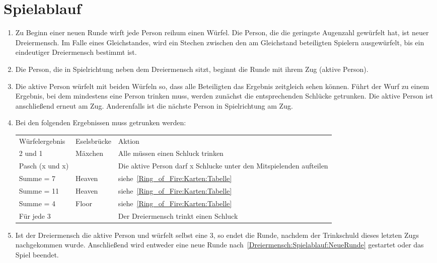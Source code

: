 \section{Spielablauf}
\begin{enumerate}[label={(\arabic*)}]
	\item\label{Dreiermensch:Spielablauf:NeueRunde}
	Zu Beginn einer neuen Runde wirft jede Person reihum einen Würfel.
	Die Person, die die geringste Augenzahl gewürfelt hat, ist neuer Dreiermensch.
	Im Falle eines Gleichstandes, wird ein Stechen zwischen den am Gleichstand beteiligten Spielern ausgewürfelt, bis ein eindeutiger Dreiermensch bestimmt ist.
	
	\item
	Die Person, die in Spielrichtung neben dem Dreiermensch sitzt, beginnt die Runde mit ihrem Zug (\glqq{}aktive Person\grqq{}).
	
	\item
	Die aktive Person würfelt mit beiden Würfeln so, dass alle Beteiligten das Ergebnis zeitgleich sehen können.
	Führt der Wurf zu einem Ergebnis, bei dem mindestens eine Person trinken muss, werden zunächst die entsprechenden Schlücke getrunken.
	Die aktive Person ist anschließend erneut am Zug.
	Anderenfalls ist die nächste Person in Spielrichtung am Zug.
	
	\item
	Bei den folgenden Ergebnissen muss getrunken werden:

	\begin{tabulary}{0.92\textwidth}{llL}
		\toprule
		Würfelergebnis   & Eselsbrücke & Aktion \\
		2 und 1          & Mäxchen & Alle müssen einen Schluck trinken \\
		Pasch (x und x)  &         & Die aktive Person darf x Schlucke unter den Mitspielenden aufteilen \\
		Summe = 7        & Heaven  & siehe~\ref{Ring_of_Fire:Karten:Tabelle} \\
		Summe = 11       & Heaven  & siehe~\ref{Ring_of_Fire:Karten:Tabelle} \\
		Summe = 4        & Floor   & siehe~\ref{Ring_of_Fire:Karten:Tabelle} \\
		Für jede 3 &         &Der Dreiermensch trinkt einen Schluck \\\bottomrule
	\end{tabulary}

	\item
	Ist der Dreiermensch die aktive Person und würfelt selbst eine 3, so endet die Runde, nachdem der Trinkschuld dieses letzten Zugs nachgekommen wurde.
	Anschließend wird entweder eine neue Runde nach~\ref{Dreiermensch:Spielablauf:NeueRunde} gestartet oder das Spiel beendet.
	

\end{enumerate}
